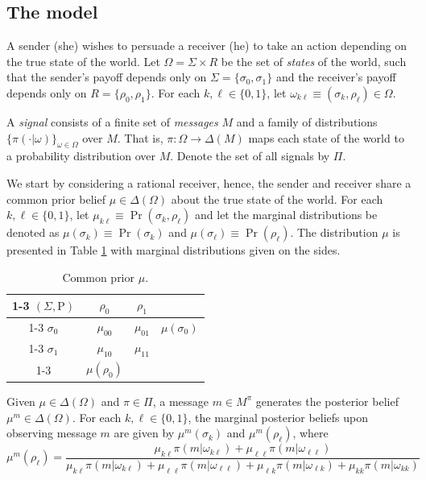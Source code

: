 \documentclass[12pt,english]{article}
\newcommand{\Rho}{\mathrm{P}}
\theoremstyle{plain}
\begin{document}
\subsection{The model}
A sender (she) wishes to persuade a receiver (he) to take an action depending on the true state of the world. 
Let $\Omega=\Sigma\times R$ be the set of \emph{states} of the world, such that the sender's payoff depends only on $\Sigma=\{\sigma_0,\sigma_1\}$ and the receiver's payoff depends only on $R=\{\rho_0,\rho_1\}$.
For each $k,\ell\in\{0,1\}$, let $\omega_{k\ell}\equiv(\sigma_k,\rho_\ell)\in\Omega$.
 
A \emph{signal} consists of a finite set of \emph{messages} $M$ and a family of distributions $\{\pi(\cdot\vert\omega)\}_{\omega\in\Omega}$ over $M$.
That is, $\pi:\Omega\rightarrow\Delta(M)$ maps each state of the world to a probability distribution over $M$.
Denote the set of all signals by $\Pi$.

We start by considering a rational receiver, hence, the sender and receiver share a common prior belief $\mu\in\Delta(\Omega)$ about the true state of the world.
For each $k,\ell\in\{0,1\}$, let $\mu_{k\ell}\equiv\Pr(\sigma_k,\rho_\ell)$ and let the marginal distributions be denoted as $\mu(\sigma_k)\equiv\Pr(\sigma_k)$ and $\mu(\sigma_\ell)\equiv\Pr(\rho_\ell)$.
The distribution $\mu$ is presented in Table \ref{tab:prior} with marginal distributions given on the sides. 
\begin{table}[H]
\begin{centering}
\begin{tabular}{|c|c|c|c}
\cline{1-3} \cline{2-3} \cline{3-3} 
$(\Sigma,\Rho)$ & $\rho_0$ & $\rho_1$ & \tabularnewline
\cline{1-3} \cline{2-3} \cline{3-3} 
$\sigma_0$ & $\mu_{00}$ & $\mu_{01}$ & $\mu(\sigma_0)$\tabularnewline
\cline{1-3} \cline{2-3} \cline{3-3} 
$\sigma_1$ & $\mu_{10}$ & $\mu_{11}$ & \tabularnewline
\cline{1-3} \cline{2-3} \cline{3-3} 
\multicolumn{1}{c}{} & \multicolumn{1}{c}{$\mu(\rho_0)$} & \multicolumn{1}{c}{} & \tabularnewline
\end{tabular}
\par\end{centering}
\caption{Common prior $\mu$.}
\label{tab:prior}
\end{table}

Given $\mu\in\Delta(\Omega)$ and $\pi\in\Pi$, a message $m\in M^\pi$ generates the posterior belief $\mu^m\in\Delta(\Omega)$.
For each $k,\ell\in\{0,1\}$, the marginal posterior beliefs upon observing message $m$ are given by $\mu^m(\sigma_k)$ and $\mu^m(\rho_\ell)$, where 
\begin{equation*}
\mu^m(\rho_\ell)=\frac{\mu_{k\ell}\pi(m\vert \omega_{k\ell})+\mu_{\ell\ell}\pi(m\vert \omega_{\ell\ell})}{\mu_{k\ell}\pi(m\vert \omega_{k\ell})+\mu_{\ell\ell}\pi(m\vert \omega_{\ell\ell})+\mu_{\ell k}\pi(m\vert \omega_{\ell k})+\mu_{kk}\pi(m\vert \omega_{kk})}
\end{equation*}
\end{document}
